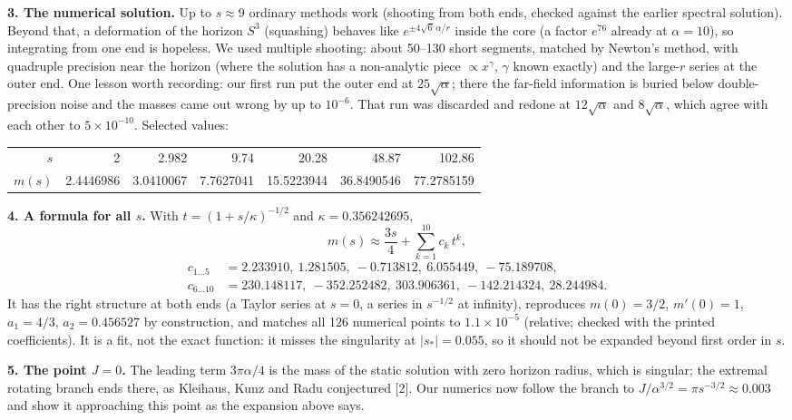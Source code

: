 \documentclass[10pt,a4paper]{article}
\begin{document}
\textbf{3. The numerical solution.} Up to $s\approx9$ ordinary methods work (shooting from both ends,
checked against the earlier spectral solution). Beyond that, a deformation of the horizon $S^3$ (squashing)
behaves like $e^{\pm4\sqrt6\,\alpha/r}$ inside the core (a factor $e^{76}$ already at $\alpha=10$), so
integrating from one end is hopeless. We used multiple shooting: about 50--130 short segments, matched by
Newton's method, with quadruple precision near the horizon (where the solution has a non-analytic piece
$\propto x^\gamma$, $\gamma$ known exactly) and the large-$r$ series at the outer end. One lesson worth
recording: our first run put the outer end at $25\sqrt\alpha$; there the far-field information is buried
below double-precision noise and the masses came out wrong by up to $10^{-6}$. That run was discarded and
redone at $12\sqrt\alpha$ and $8\sqrt\alpha$, which agree with each other to $5\times10^{-10}$.
Selected values:
\begin{center}\small
\begin{tabular}{rrrrrrr}\toprule
$s$ & 2 & 2.982 & 9.74 & 20.28 & 48.87 & 102.86\\
$m(s)$ & 2.4446986 & 3.0410067 & 7.7627041 & 15.5223944 & 36.8490546 & 77.2785159\\\bottomrule
\end{tabular}
\end{center}

\textbf{4. A formula for all $s$.} With $t=(1+s/\kappa)^{-1/2}$ and $\kappa=0.356242695$,
\[
m(s)\approx\frac{3s}{4}+\sum_{k=1}^{10}c_k\,t^k ,
\]
\[
\begin{aligned}
c_{1\dots5}&=2.233910,\ 1.281505,\ -0.713812,\ 6.055449,\ -75.189708,\\
c_{6\dots10}&=230.148117,\ -352.252482,\ 303.906361,\ -142.214324,\ 28.244984.
\end{aligned}
\] It has the right structure at both ends (a Taylor series at $s=0$, a series in
$s^{-1/2}$ at infinity), reproduces $m(0)=3/2$, $m'(0)=1$, $a_1=4/3$, $a_2=0.456527$ by construction, and
matches all 126 numerical points to $1.1\times10^{-5}$ (relative; checked with the printed coefficients).
It is a fit, not the exact function: it misses the singularity at $|s_*|=0.055$, so it should not be
expanded beyond first order in $s$.

\textbf{5. The point $J=0$.} The leading term $3\pi\alpha/4$ is the mass of the static solution with zero
horizon radius, which is singular; the extremal rotating branch ends there, as Kleihaus, Kunz and Radu
conjectured [2]. Our numerics now follow the branch to $J/\alpha^{3/2}=\pi s^{-3/2}\approx0.003$ and show it approaching
this point as the expansion above says.
\end{document}
